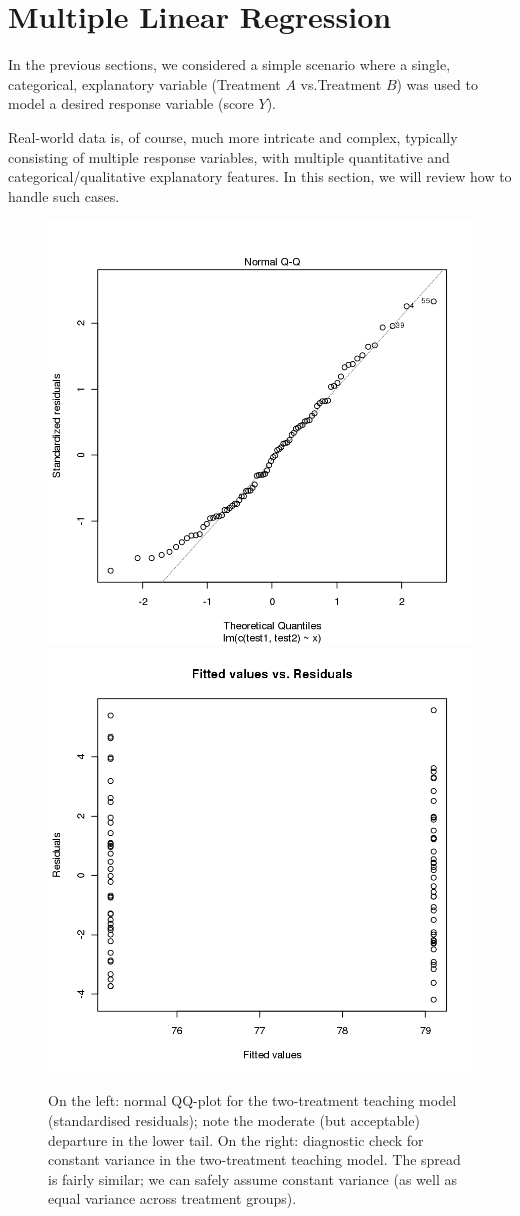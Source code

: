 
\section{Multiple Linear Regression}\label{sec:MLR}
In the previous sections, we considered a simple scenario where a single, categorical, explanatory variable (Treatment $A$ vs.\@ Treatment $B$) was used to model a desired response variable (score $Y$). \par Real-world data is, of course, much more intricate and complex, typically consisting of multiple response variables, with multiple quantitative and categorical/qualitative explanatory features. \newl In this section, we will review how to handle such cases.
\begin{figure}[t]
\centering
  \includegraphics[width=0.475\linewidth]{Images/testA3.png} \quad  \includegraphics[width=0.475\linewidth]{Images/testA4.png}
  \caption{\small On the left: normal QQ-plot for the two-treatment teaching model (standardised residuals); note the moderate (but acceptable) departure in the lower tail. On the right: diagnostic check for constant variance in the two-treatment teaching model. The spread is fairly similar; we can safely assume constant variance (as well as equal variance across treatment groups).}
  \label{fig:testA3}
\end{figure}
